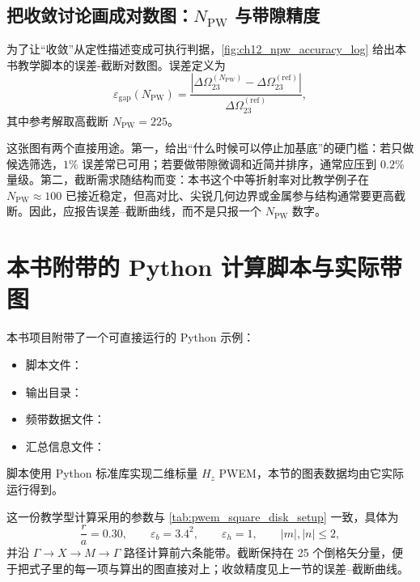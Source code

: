 \subsection*{把收敛讨论画成对数图：$N_{\mathrm{PW}}$ 与带隙精度}
为了让“收敛”从定性描述变成可执行判据，\cref{fig:ch12_npw_accuracy_log} 给出本书教学脚本的误差-截断对数图。误差定义为
\[
\varepsilon_{\mathrm{gap}}(N_{\mathrm{PW}})
=
\frac{\left|\Delta\Omega_{23}^{(N_{\mathrm{PW}})}-\Delta\Omega_{23}^{(\mathrm{ref})}\right|}{\Delta\Omega_{23}^{(\mathrm{ref})}},
\]
其中参考解取高截断 $N_{\mathrm{PW}}=225$。



这张图有两个直接用途。第一，给出“什么时候可以停止加基底”的硬门槛：若只做候选筛选，$1\%$ 误差常已可用；若要做带隙微调和近简并排序，通常应压到 $0.2\%$ 量级。第二，截断需求随结构而变：本书这个中等折射率对比教学例子在 $N_{\mathrm{PW}}\approx 100$ 已接近稳定，但高对比、尖锐几何边界或金属参与结构通常要更高截断\cite{johnson2001,li1996}。因此，应报告误差--截断曲线，而不是只报一个 $N_{\mathrm{PW}}$ 数字。

\section{本书附带的 Python 计算脚本与实际带图}
本书项目附带了一个可直接运行的 Python 示例：
\begin{itemize}
  \item 脚本文件：
  \item 输出目录：
  \item 频带数据文件：
  \item 汇总信息文件：
\end{itemize}
脚本使用 Python 标准库实现二维标量 $H_z$ PWEM，本节的图表数据均由它实际运行得到。

这一份教学型计算采用的参数与 \cref{tab:pwem_square_disk_setup} 一致，具体为
\begin{equation}
\frac{r}{a}=0.30,
\qquad
\varepsilon_b = 3.4^2,
\qquad
\varepsilon_h = 1,
\qquad
|m|,|n|\le 2,
\label{eq:pwem_python_setup}
\end{equation}
并沿 $\Gamma\rightarrow X\rightarrow M\rightarrow\Gamma$ 路径计算前六条能带。截断保持在 25 个倒格矢分量，便于把式子里的每一项与算出的图直接对上；收敛精度见上一节的误差--截断曲线。

